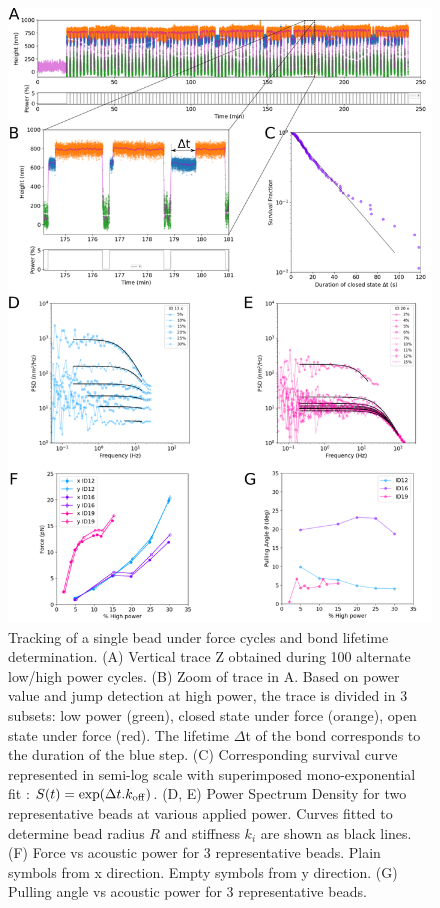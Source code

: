 \documentclass{biophys-new}
\begin{document}
\begin{figure}[hbt!]
	\centering
	\includegraphics[width=0.75\linewidth]{Figures/fig2.png}
	\caption{ Tracking of a single bead under force cycles and bond lifetime determination. (A) Vertical trace Z obtained during 100 alternate low/high power cycles. (B) Zoom of trace in A. Based on power value and jump detection at high power, the trace is divided in 3 subsets: low power (green), closed state under force (orange), open state under force (red). The lifetime $\Delta$t of the bond corresponds to the duration of the blue step. (C) Corresponding survival curve represented in semi-log scale with superimposed mono-exponential fit : $S(t) = \exp(\Delta t. k_{{\rm off}})$. (D, E) Power Spectrum Density for two representative beads at various applied power. Curves fitted to determine bead radius $R$ and stiffness $k_i$ are shown as black lines. (F) Force vs acoustic power for 3 representative beads. Plain symbols from x direction. Empty symbols from y direction. (G) Pulling angle vs acoustic power for 3 representative beads.}
	\label{fig:lifetime}
\end{figure}
\end{document}
